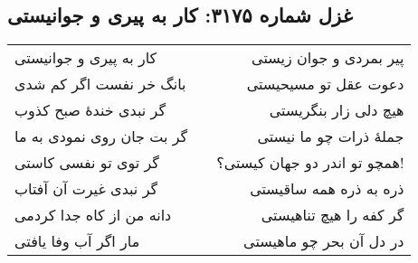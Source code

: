 \begin{center}
\section*{غزل شماره ۳۱۷۵: کار به پیری و جوانیستی}
\label{sec:3175}
\begin{longtable}{l p{0.5cm} r}
کار به پیری و جوانیستی
&&
پیر بمردی و جوان زیستی
\\
بانگ خر نفست اگر کم شدی
&&
دعوت عقل تو مسیحیستی
\\
گر نبدی خندهٔ صبح کذوب
&&
هیچ دلی زار بنگریستی
\\
گر بت جان روی نمودی به ما
&&
جملهٔ ذرات چو ما نیستی
\\
گر توی تو نفسی کاستی
&&
همچو تو اندر دو جهان کیستی؟!
\\
گر نبدی غیرت آن آفتاب
&&
ذره به ذره همه ساقیستی
\\
دانه من از کاه جدا کردمی
&&
گر کفه را هیچ تناهیستی
\\
مار اگر آب وفا یافتی
&&
در دل آن بحر چو ماهیستی
\\
\end{longtable}
\end{center}

